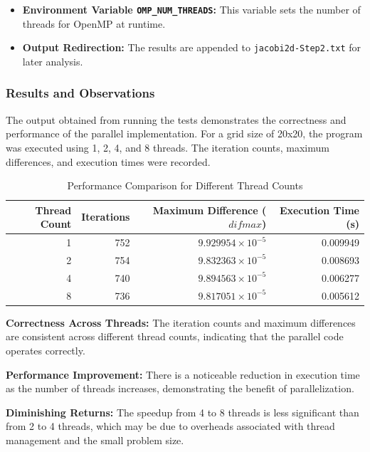 \documentclass{article}
\begin{document}
    \begin{itemize}
        \item \textbf{Environment Variable \texttt{OMP\_NUM\_THREADS}:} This variable sets the number of threads for OpenMP at runtime.
        \item \textbf{Output Redirection:} The results are appended to \texttt{jacobi2d-Step2.txt} for later analysis.
    \end{itemize}


\subsubsection{Results and Observations}

The output obtained from running the tests demonstrates the correctness and performance of the parallel implementation. For a grid size of 20x20, the program was executed using 1, 2, 4, and 8 threads. The iteration counts, maximum differences, and execution times were recorded.

\begin{table}[H]
    \centering
    \caption{Performance Comparison for Different Thread Counts}
    \label{tab:performance_comparison}
    \begin{tabular}{rrrr}
    \toprule
    \textbf{Thread Count} & \textbf{Iterations} & \textbf{Maximum Difference ($difmax$)} & \textbf{Execution Time (s)} \\
    \midrule
    1 & 752 & $9.929954 \times 10^{-5}$ & 0.009949 \\
    2 & 754 & $9.832363 \times 10^{-5}$ & 0.008693 \\
    4 & 740 & $9.894563 \times 10^{-5}$ & 0.006277 \\
    8 & 736 & $9.817051 \times 10^{-5}$ & 0.005612 \\
    \bottomrule
    \end{tabular}
\end{table}


\textbf{Correctness Across Threads:} The iteration counts and maximum differences are consistent across different thread counts, indicating that the parallel code operates correctly.

\textbf{Performance Improvement:} There is a noticeable reduction in execution time as the number of threads increases, demonstrating the benefit of parallelization.

\textbf{Diminishing Returns:} The speedup from 4 to 8 threads is less significant than from 2 to 4 threads, which may be due to overheads associated with thread management and the small problem size.
\end{document}
